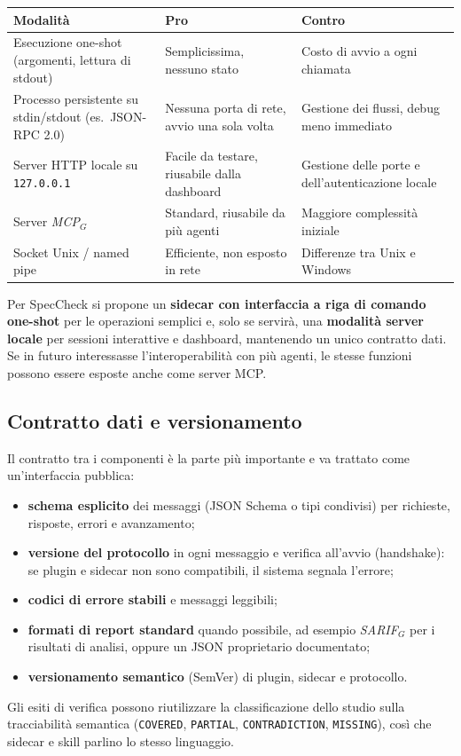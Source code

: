 \documentclass[a4paper, 11pt]{article}
\newcommand{\term}[1]{\textit{#1}$_G$} %
\begin{document}
\vspace{0.3cm}
\noindent
\begin{tabularx}{\textwidth}{|l|X|X|}
    \hline
    \textbf{Modalità} & \textbf{Pro} & \textbf{Contro} \\ \hline
    Esecuzione one-shot (argomenti, lettura di stdout) & Semplicissima, nessuno stato & Costo di avvio a ogni chiamata \\ \hline
    Processo persistente su stdin/stdout (es.\ JSON-RPC 2.0) & Nessuna porta di rete, avvio una sola volta & Gestione dei flussi, debug meno immediato \\ \hline
    Server HTTP locale su \texttt{127.0.0.1} & Facile da testare, riusabile dalla dashboard & Gestione delle porte e dell'autenticazione locale \\ \hline
    Server \term{MCP} & Standard, riusabile da più agenti & Maggiore complessità iniziale \\ \hline
    Socket Unix / named pipe & Efficiente, non esposto in rete & Differenze tra Unix e Windows \\ \hline
\end{tabularx}
\vspace{0.3cm}

Per SpecCheck si propone un \textbf{sidecar con interfaccia a riga di comando one-shot} per le operazioni semplici e, solo se servirà, una \textbf{modalità server locale} per sessioni interattive e dashboard, mantenendo un unico contratto dati. Se in futuro interessasse l'interoperabilità con più agenti, le stesse funzioni possono essere esposte anche come server MCP.

\subsection{Contratto dati e versionamento}
Il contratto tra i componenti è la parte più importante e va trattato come un'interfaccia pubblica:
\begin{itemize}[noitemsep]
    \item \textbf{schema esplicito} dei messaggi (JSON Schema o tipi condivisi) per richieste, risposte, errori e avanzamento;
    \item \textbf{versione del protocollo} in ogni messaggio e verifica all'avvio (handshake): se plugin e sidecar non sono compatibili, il sistema segnala l'errore;
    \item \textbf{codici di errore stabili} e messaggi leggibili;
    \item \textbf{formati di report standard} quando possibile, ad esempio \term{SARIF} per i risultati di analisi, oppure un JSON proprietario documentato;
    \item \textbf{versionamento semantico} (SemVer) di plugin, sidecar e protocollo.
\end{itemize}
Gli esiti di verifica possono riutilizzare la classificazione dello studio sulla tracciabilità semantica (\texttt{COVERED}, \texttt{PARTIAL}, \texttt{CONTRADICTION}, \texttt{MISSING}), così che sidecar e skill parlino lo stesso linguaggio.
\end{document}
